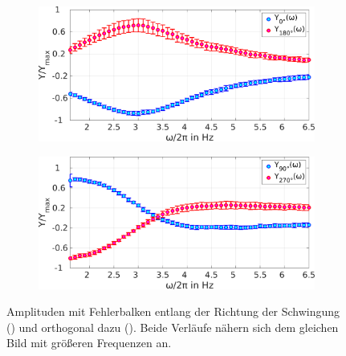           \begin{figure}[!t]
            \centering
            \begin{subfigure}{0.49\textwidth}
              \includegraphics[width=\textwidth,height=0.6\textwidth]{figs/auswertung/phasen/dipolamplitude0180.png}
              \caption{}
            \end{subfigure}
            \begin{subfigure}{0.49\textwidth}
              \includegraphics[width=\textwidth,height=0.6\textwidth]{figs/auswertung/phasen/dipolamplitude90270.png}
              \caption{}
            \end{subfigure}
            \caption{Amplituden mit Fehlerbalken entlang der Richtung der Schwingung () und orthogonal dazu (). Beide Verläufe nähern sich dem gleichen Bild mit größeren Frequenzen an.}\label{img:dipolamplituden}
          \end{figure}

